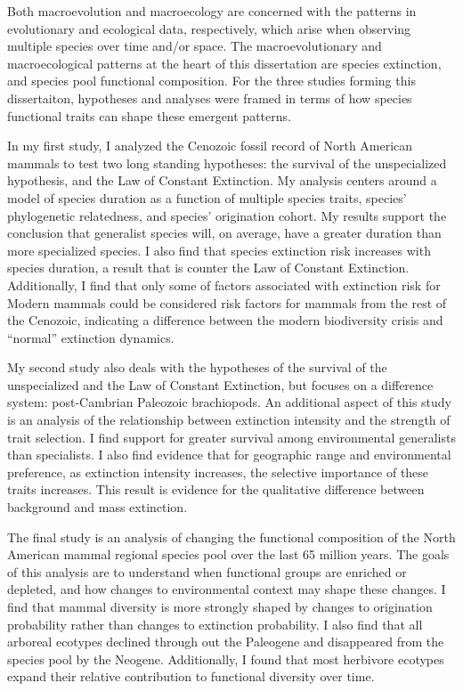 \abstract

Both macroevolution and macroecology are concerned with the patterns in evolutionary and ecological data, respectively, which arise when observing multiple species over time and/or space. The macroevolutionary and macroecological patterns at the heart of this dissertation are species extinction, and species pool functional composition. For the three studies forming this dissertaiton, hypotheses and analyses were framed in terms of how species functional traits can shape these emergent patterns. 

In my first study, I analyzed the Cenozoic fossil record of North American mammals to test two long standing hypotheses: the survival of the unspecialized hypothesis, and the Law of Constant Extinction. My analysis centers around a model of species duration as a function of multiple species traits, species' phylogenetic relatedness, and species' origination cohort. My results support the conclusion that generalist species will, on average, have a greater duration than more specialized species. I also find that species extinction risk increases with species duration, a result that is counter the Law of Constant Extinction. Additionally, I find that only some of factors associated with extinction risk for Modern mammals could be considered risk factors for mammals from the rest of the Cenozoic, indicating a difference between the modern biodiversity crisis and ``normal'' extinction dynamics.

My second study also deals with the hypotheses of the survival of the unspecialized and the Law of Constant Extinction, but focuses on a difference system: post-Cambrian Paleozoic brachiopods. An additional aspect of this study is an analysis of the relationship between extinction intensity and the strength of trait selection. I find support for greater survival among environmental generalists than specialists. I also find evidence that for geographic range and environmental preference, as extinction intensity increases, the selective importance of these traits increases. This result is evidence for the qualitative difference between background and mass extinction.

The final study is an analysis of changing the functional composition of the North American mammal regional species pool over the last 65 million years. The goals of this analysis are to understand when functional groups are enriched or depleted, and how changes to environmental context may shape these changes. I find that mammal diversity is more strongly shaped by changes to origination probability rather than changes to extinction probability. I also find that all arboreal ecotypes declined through out the Paleogene and disappeared from the species pool by the Neogene. Additionally, I found that most herbivore ecotypes expand their relative contribution to functional diversity over time.

